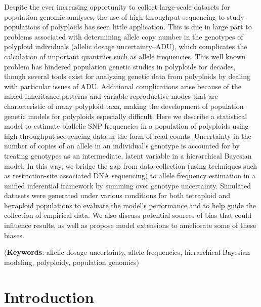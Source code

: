 \documentclass[11pt,english,letterpaper,oneside]{article}
\begin{document}
Despite the ever increasing opportunity to collect large-scale datasets for population genomic analyses, the use of high throughput sequencing to study populations of polyploids has seen little application. This is due in large part to problems associated with determining allele copy number in the genotypes of polyploid individuals (allelic dosage uncertainty--ADU), which complicates the calculation of important quantities such as allele frequencies. This well known problem has hindered population genetic studies in polyploids for decades, though several tools exist for analyzing genetic data from polyploids by dealing with particular issues of ADU. Additional complications arise because of the mixed inheritance patterns and variable reproductive modes that are characteristic of many polyploid taxa, making the development of population genetic models for polyploids especially difficult. Here we describe a statistical model to estimate biallelic SNP frequencies in a population of polyploids using high throughput sequencing data in the form of read counts. Uncertainty in the number of copies of an allele in an individual's genotype is accounted for by treating genotypes as an intermediate, latent variable in a hierarchical Bayesian model. In this way, we bridge the gap from data collection (using techniques such as restriction-site associated DNA sequencing) to allele frequency estimation in a unified inferential framework by summing over genotype uncertainty. Simulated datasets were generated under various conditions for both tetraploid and hexaploid populations to evaluate the model's performance and to help guide the collection of empirical data. We also discuss potential sources of bias that could influence results, as well as propose model extensions to ameliorate some of these biases.
\vspace{0.25in}

\noindent (\textbf{Keywords}: allelic dosage uncertainty, allele frequencies, hierarchical Bayesian modeling, polyploidy, population genomics)
\vspace{0.25in}

\section*{Introduction}            %
\end{document}
